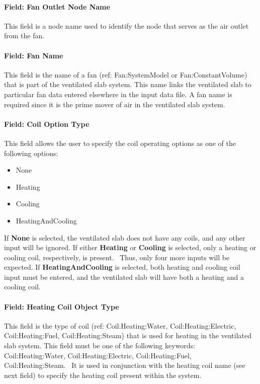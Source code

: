 \paragraph{Field: Fan Outlet Node Name}\label{field-fan-outlet-node-name}

This field is a node name used to identify the node that serves as the air outlet from the fan.

\paragraph{Field: Fan Name}\label{field-fan-name-003}

This field is the name of a fan (ref: Fan:SystemModel or Fan:ConstantVolume) that is part of the ventilated slab system.  This name links the ventilated slab to particular fan data entered elsewhere in the input data file.  A fan name is required since it is the prime mover of air in the ventilated slab system.

\paragraph{Field: Coil Option Type}\label{field-coil-option-type}

This field allows the user to specify the coil operating options as one of the following options:

\begin{itemize}
\item
  None
\item
  Heating
\item
  Cooling
\item
  HeatingAndCooling
\end{itemize}

If \textbf{None} is selected, the ventilated slab does not have any coils, and any other input will be ignored. If either \textbf{Heating} or \textbf{Cooling} is selected, only a heating or cooling coil, respectively, is present.~ Thus, only four more inputs will be expected. If \textbf{HeatingAndCooling} is selected, both heating and cooling coil input must be entered, and the ventilated slab will have both a heating and a cooling coil.

\paragraph{Field: Heating Coil Object Type}\label{field-heating-coil-object-type-001}

This field is the type of coil (ref: Coil:Heating:Water, Coil:Heating:Electric, Coil:Heating:Fuel, Coil:Heating:Steam) that is used for heating in the ventilated slab system. This field must be one of the following keywords: Coil:Heating:Water, Coil:Heating:Electric, Coil:Heating:Fuel, Coil:Heating:Steam.~ It is used in conjunction with the heating coil name (see next field) to specify the heating coil present within the system.

